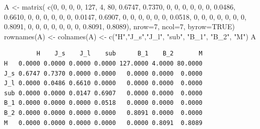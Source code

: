 \documentclass[
  letterpaper,
  DIV=11,
  numbers=noendperiod]{scrreprt}
\newenvironment{Shaded}{\begin{snugshade}}{\end{snugshade}}
\newcommand{\AttributeTok}[1]{\textcolor[rgb]{0.40,0.45,0.13}{#1}}
\newcommand{\ConstantTok}[1]{\textcolor[rgb]{0.56,0.35,0.01}{#1}}
\newcommand{\DecValTok}[1]{\textcolor[rgb]{0.68,0.00,0.00}{#1}}
\newcommand{\FloatTok}[1]{\textcolor[rgb]{0.68,0.00,0.00}{#1}}
\newcommand{\FunctionTok}[1]{\textcolor[rgb]{0.28,0.35,0.67}{#1}}
\newcommand{\NormalTok}[1]{\textcolor[rgb]{0.00,0.23,0.31}{#1}}
\newcommand{\OtherTok}[1]{\textcolor[rgb]{0.00,0.23,0.31}{#1}}
\newcommand{\StringTok}[1]{\textcolor[rgb]{0.13,0.47,0.30}{#1}}
\begin{document}
\begin{Shaded}
\begin{Highlighting}[]
\NormalTok{A }\OtherTok{\textless{}{-}} \FunctionTok{matrix}\NormalTok{(}
  \FunctionTok{c}\NormalTok{(}\DecValTok{0}\NormalTok{,      }\DecValTok{0}\NormalTok{,      }\DecValTok{0}\NormalTok{,      }\DecValTok{0}\NormalTok{,    }\DecValTok{127}\NormalTok{,      }\DecValTok{4}\NormalTok{,    }\DecValTok{80}\NormalTok{,}
    \FloatTok{0.6747}\NormalTok{, }\FloatTok{0.7370}\NormalTok{, }\DecValTok{0}\NormalTok{,      }\DecValTok{0}\NormalTok{,      }\DecValTok{0}\NormalTok{,      }\DecValTok{0}\NormalTok{,     }\DecValTok{0}\NormalTok{,}
    \DecValTok{0}\NormalTok{,      }\FloatTok{0.0486}\NormalTok{, }\FloatTok{0.6610}\NormalTok{, }\DecValTok{0}\NormalTok{,      }\DecValTok{0}\NormalTok{,      }\DecValTok{0}\NormalTok{,     }\DecValTok{0}\NormalTok{,}
    \DecValTok{0}\NormalTok{,      }\DecValTok{0}\NormalTok{,      }\FloatTok{0.0147}\NormalTok{, }\FloatTok{0.6907}\NormalTok{, }\DecValTok{0}\NormalTok{,      }\DecValTok{0}\NormalTok{,     }\DecValTok{0}\NormalTok{,}
    \DecValTok{0}\NormalTok{,      }\DecValTok{0}\NormalTok{,      }\DecValTok{0}\NormalTok{,      }\FloatTok{0.0518}\NormalTok{, }\DecValTok{0}\NormalTok{,      }\DecValTok{0}\NormalTok{,      }\DecValTok{0}\NormalTok{,}
    \DecValTok{0}\NormalTok{,      }\DecValTok{0}\NormalTok{,      }\DecValTok{0}\NormalTok{,      }\DecValTok{0}\NormalTok{,      }\FloatTok{0.8091}\NormalTok{, }\DecValTok{0}\NormalTok{,      }\DecValTok{0}\NormalTok{,}
    \DecValTok{0}\NormalTok{,      }\DecValTok{0}\NormalTok{,      }\DecValTok{0}\NormalTok{,      }\DecValTok{0}\NormalTok{,      }\DecValTok{0}\NormalTok{,      }\FloatTok{0.8091}\NormalTok{, }\FloatTok{0.8089}\NormalTok{), }
\AttributeTok{nrow=}\DecValTok{7}\NormalTok{, }\AttributeTok{ncol=}\DecValTok{7}\NormalTok{, }\AttributeTok{byrow=}\ConstantTok{TRUE}\NormalTok{)}
\FunctionTok{rownames}\NormalTok{(A) }\OtherTok{\textless{}{-}} \FunctionTok{colnames}\NormalTok{(A) }\OtherTok{\textless{}{-}} \FunctionTok{c}\NormalTok{(}\StringTok{"H"}\NormalTok{,}\StringTok{"J\_s"}\NormalTok{,}\StringTok{"J\_l"}\NormalTok{, }\StringTok{"sub"}\NormalTok{, }\StringTok{"B\_1"}\NormalTok{, }\StringTok{"B\_2"}\NormalTok{, }\StringTok{"M"}\NormalTok{)}
\NormalTok{A}
\end{Highlighting}
\end{Shaded}

\begin{verbatim}
         H    J_s    J_l    sub      B_1    B_2       M
H   0.0000 0.0000 0.0000 0.0000 127.0000 4.0000 80.0000
J_s 0.6747 0.7370 0.0000 0.0000   0.0000 0.0000  0.0000
J_l 0.0000 0.0486 0.6610 0.0000   0.0000 0.0000  0.0000
sub 0.0000 0.0000 0.0147 0.6907   0.0000 0.0000  0.0000
B_1 0.0000 0.0000 0.0000 0.0518   0.0000 0.0000  0.0000
B_2 0.0000 0.0000 0.0000 0.0000   0.8091 0.0000  0.0000
M   0.0000 0.0000 0.0000 0.0000   0.0000 0.8091  0.8089
\end{verbatim}
\end{document}
